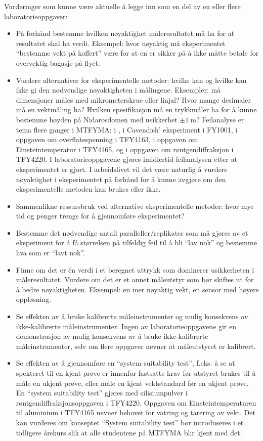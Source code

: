 \documentclass{article}
\begin{document}
Vurderinger som kunne være aktuelle å legge inn som en del av en eller flere laboratorieoppgaver:
\begin{itemize}
  \item På forhånd bestemme hvilken nøyaktighet måleresultatet må ha for at resultatet skal ha verdi. Eksempel: hvor nøyaktig må eksperimentet ``bestemme vekt på koffert'' være for at en er sikker på å ikke måtte betale for overvektig bagasje på flyet.

  \item Vurdere alternativer for eksperimentelle metoder: hvilke kan og hvilke kan ikke gi den nødvendige nøyaktigheten i målingene. Eksempler: må dimensjoner måles med mikrometerskrue eller linjal? Hvor mange desimaler må en vektmåling ha? Hvilken spesifikasjon må en trykkmåler ha for å kunne bestemme høyden på Nidarosdomen med usikkerhet $\pm\SI{1}{\meter}$? Feilanalyse er tema flere ganger i MTFYMA: i \cite{Persson2020}, i Cavendish’ eksperiment i FY1001, i oppgaven om overflatespenning i TFY4163, i oppgaven om Einsteintemperatur i TFY4165, og i oppgaven om røntgendiffraksjon i TFY4220. I laboratorieoppgavene gjøres imidlertid feilanalysen etter at eksperimentet er gjort. I arbeidslivet vil det være naturlig å vurdere nøyaktighet i eksperimentet på forhånd for å kunne avgjøre om den eksperimentelle metoden kan brukes eller ikke.

  \item Sammenlikne ressursbruk ved alternative eksperimentelle metoder: hvor mye tid og penger trengs for å gjennomføre eksperimentet?

  \item Bestemme det nødvendige antall paralleller/replikater som må gjøres av et eksperiment for å få størrelsen på tilfeldig feil til å bli ``lav nok'' og bestemme hva som er ``lavt nok''.

  \item Finne om det er én verdi i et beregnet uttrykk som dominerer usikkerheten i måleresultatet. Vurdere om det er et annet måleutstyr som bør skiftes ut for å bedre nøyaktigheten. Eksempel: en mer nøyaktig vekt, en sensor med høyere oppløsning.

  \item Se effekten av å bruke kalibrerte måleinstrumenter og mulig konsekvens av ikke-kalibrerte måleinstrumenter. Ingen av laboratorieoppgavene gir en demonstrasjon av mulig konsekvens av å bruke ikke-kalibrerte måleinstrumenter, selv om flere oppgaver nevner at måleutstyret er kalibrert.

  \item Se effekten av å gjennomføre en ``system suitability test'', f.eks. å se at spekteret til en kjent prøve er innenfor fastsatte krav før utstyret brukes til å måle en ukjent prøve, eller måle en kjent vektstandard før en ukjent prøve.  En ``system suitability test'' gjøres med silisiumpulver i røntgendiffraksjonsoppgaven i TFY4220. Oppgaven om Einsteintemperaturen til aluminium i TFY4165 nevner behovet for vatring og tarering av vekt. Det kan vurderes om konseptet ``System suitability test'' bør introduseres i et tidligere årskurs slik at alle studentene på MTFYMA blir kjent med det.
\end{itemize}
\end{document}
